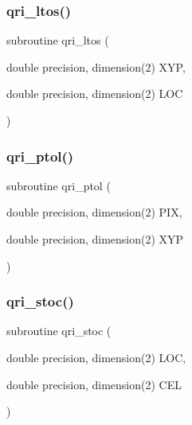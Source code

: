 \mbox{\label{qri__init_8f_a32b9e76d54937342c2d26dfa7d2638ab}} 
\subsubsection{\texorpdfstring{qri\+\_\+ltos()}{qri\_ltos()}}
{\footnotesize\ttfamily subroutine qri\+\_\+ltos (\begin{DoxyParamCaption}\item[{double precision, dimension(2)}]{X\+YP,  }\item[{double precision, dimension(2)}]{L\+OC }\end{DoxyParamCaption})}

\mbox{\label{qri__init_8f_a70637518ae19a768e868a4235c667703}} 
\subsubsection{\texorpdfstring{qri\+\_\+ptol()}{qri\_ptol()}}
{\footnotesize\ttfamily subroutine qri\+\_\+ptol (\begin{DoxyParamCaption}\item[{double precision, dimension(2)}]{P\+IX,  }\item[{double precision, dimension(2)}]{X\+YP }\end{DoxyParamCaption})}

\mbox{\label{qri__init_8f_ae668fbb113c1d6d90dfa9cefc880d9c8}} 
\subsubsection{\texorpdfstring{qri\+\_\+stoc()}{qri\_stoc()}}
{\footnotesize\ttfamily subroutine qri\+\_\+stoc (\begin{DoxyParamCaption}\item[{double precision, dimension(2)}]{L\+OC,  }\item[{double precision, dimension(2)}]{C\+EL }\end{DoxyParamCaption})}

